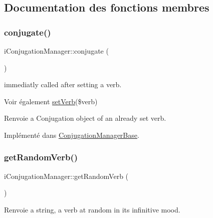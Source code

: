 \subsection{Documentation des fonctions membres}
\hypertarget{interfacei_conjugation_manager_afba24324d7c48d3ab00ffba63cbc1b9e}{}\label{interfacei_conjugation_manager_afba24324d7c48d3ab00ffba63cbc1b9e} 
\subsubsection{\texorpdfstring{conjugate()}{conjugate()}}
{\footnotesize\ttfamily i\+Conjugation\+Manager\+::conjugate (\begin{DoxyParamCaption}{ }\end{DoxyParamCaption})}



immediatly called after setting a verb. 

\begin{DoxySeeAlso}{Voir également}
\hyperlink{interfacei_conjugation_manager_a1b56822fc7f5f7b7b9c0b0c406993b3c}{set\+Verb}(\$verb) 
\end{DoxySeeAlso}
\begin{DoxyReturn}{Renvoie}
a Conjugation object of an already set verb. 
\end{DoxyReturn}


Implémenté dans \hyperlink{class_conjugation_manager_base_a20e28aa17935e10b1a763b39a3c4fdf3}{Conjugation\+Manager\+Base}.

\hypertarget{interfacei_conjugation_manager_a2e955e8c88d45869683005343cbfac60}{}\label{interfacei_conjugation_manager_a2e955e8c88d45869683005343cbfac60} 
\subsubsection{\texorpdfstring{get\+Random\+Verb()}{getRandomVerb()}}
{\footnotesize\ttfamily i\+Conjugation\+Manager\+::get\+Random\+Verb (\begin{DoxyParamCaption}{ }\end{DoxyParamCaption})}

\begin{DoxyReturn}{Renvoie}
a string, a verb at random in its infinitive mood. 
\end{DoxyReturn}


